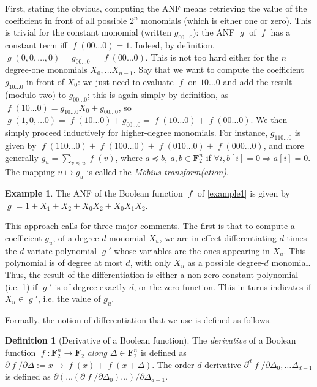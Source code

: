 \documentclass[11pt,a4paper]{article}
\theoremstyle{definition}
\newtheorem{defi}{Definition}
\newtheorem{example}{Example}
\theoremstyle{theorem}
\DeclareMathOperator\bF{\mathit{f}}
\DeclareMathOperator\abF{\mathit{g}}
\begin{document}
First, stating the obvious, computing the ANF means retrieving the value of the coefficient in front of all possible $2^n$ monomials (which
is either one or zero). This is trivial for the constant monomial (written $g_{00\ldots0}$): the ANF $\abF$ of $\bF$ has a constant term iff $\bF(00\ldots0) = 1$.
Indeed, by definition, $\abF(0,0,\ldots,0) = g_{00\ldots0} = \bF(00\ldots0)$.
This is not too hard either for the $n$ degree-one monomials $X_0,\ldots X_{n-1}$. Say that we want to compute the coefficient $g_{10\ldots0}$
in front of $X_0$: we just need to evaluate $\bF$ on $10\ldots0$ and add the result (modulo two) to $g_{00\ldots0}$;
this is again simply by definition, as $\bF(10\ldots0) = g_{10\ldots0}X_0 + g_{00\ldots0}$, so
$\abF(1,0,\ldots0) = \bF(10\ldots0) + g_{00\ldots0} = \bF(10\ldots0) + \bF(00\ldots0)$.
We then simply proceed inductively for higher-degree monomials. For instance,
$g_{110\ldots0}$ is given by $\bF(110\ldots0) + \bF(100\ldots0) + \bF(010\ldots0) + \bF(000\ldots0)$, and more generally
$g_u = \sum_{v \preccurlyeq u} \bF(v)$, where $a \preccurlyeq b,~a,b\in \mathbf{F}_2^n$ if $\forall i, b[i] = 0 \Rightarrow a[i] = 0$.
The mapping $u \mapsto g_u$ is called the \emph{Möbius transform(ation)}.

\begin{example}
The ANF of the Boolean function $\bF$ of \autoref{example1} is given by
$\abF = 1 + X_1 + X_2 + X_0X_2 + X_0X_1X_2$.
\end{example}

This approach calls for three major comments. The first is that to compute a coefficient $g_u$, of a degree-$d$ monomial $X_u$,
we are in effect differentiating $d$ times the $d$-variate polynomial $\abF'$ whose variables are the ones appearing
in $X_u$. This polynomial is of degree at most $d$, with only $X_u$ as a possible degree-$d$ monomial. Thus, the result
of the differentiation is either a non-zero constant polynomial (i.e. 1) if $\abF'$ is of degree exactly $d$, or the
zero function. This in turns indicates if $X_u \in \abF'$, i.e. the value of $g_u$.

Formally, the notion of differentiation that we use is defined as follows.
\begin{defi}[Derivative of a Boolean function]
The \emph{derivative} of a Boolean function $\bF : \mathbf{F}_2^n \rightarrow \mathbf{F}_2$ \emph{along} $\Delta \in \mathbf{F}_2^n$
is defined as $\partial\bF/\partial\Delta := x \mapsto \bF(x) + \bF(x + \Delta)$. The order-$d$ derivative
$\partial^d\bF/\partial\Delta_0,\ldots\Delta_{d-1}$ is defined as $\partial(\ldots(\partial\bF/\partial\Delta_0)\ldots)/\partial\Delta_{d-1}$.
\end{defi}
\end{document}

